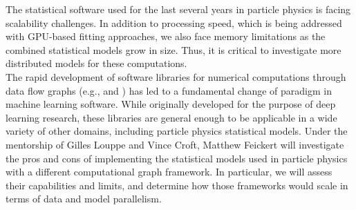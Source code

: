 The statistical software used for the last several years in particle physics is facing scalability challenges.
In addition to processing speed, which is being addressed with GPU-based fitting approaches, we also face memory limitations as the combined statistical models grow in size.
Thus, it is critical to investigate more distributed models for these computations.\\

The rapid development of software libraries for numerical computations through data flow graphs (e.g.,  and ) has led to a fundamental change of paradigm in machine learning software.
While originally developed for the purpose of deep learning research, these libraries are general enough to be applicable in a wide variety of other domains, including particle physics statistical models.
Under the mentorship of Gilles Louppe and Vince Croft, Matthew Feickert will investigate the pros and cons of implementing the statistical models used in particle physics with a different computational graph framework.
In particular, we will assess their capabilities and limits, and determine how those frameworks would scale in terms of data and model parallelism.

